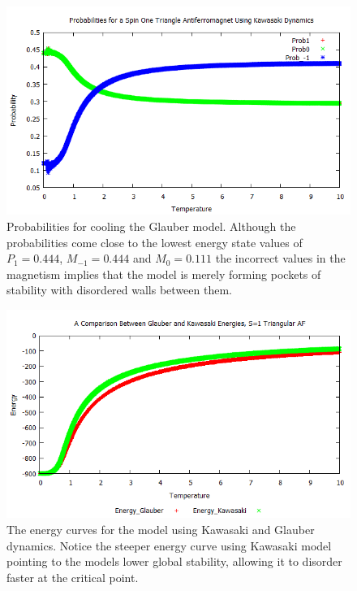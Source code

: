 \documentclass[]{article}
\begin{document}
\begin{figure}
\begin{center}
\includegraphics[scale=0.75]{Prob_K}
\caption{Probabilities for cooling the Glauber model. Although the probabilities come close to the lowest energy state values of $P_{1}=0.444$, $M_{-1}=0.444$ and $M_{0}=0.111$ the incorrect values in the magnetism implies that the model is merely forming pockets of stability with disordered walls between them.}
\label{Prob_K}
\end{center}
\end{figure}

\begin{figure}
\begin{center}
\includegraphics[scale=0.75]{Energy}
\caption{The energy curves for the model using Kawasaki and Glauber dynamics. Notice the steeper energy curve using Kawasaki model pointing to the models lower global stability, allowing it to disorder faster at the critical point.}
\label{Energy}
\end{center}
\end{figure}
\end{document}
